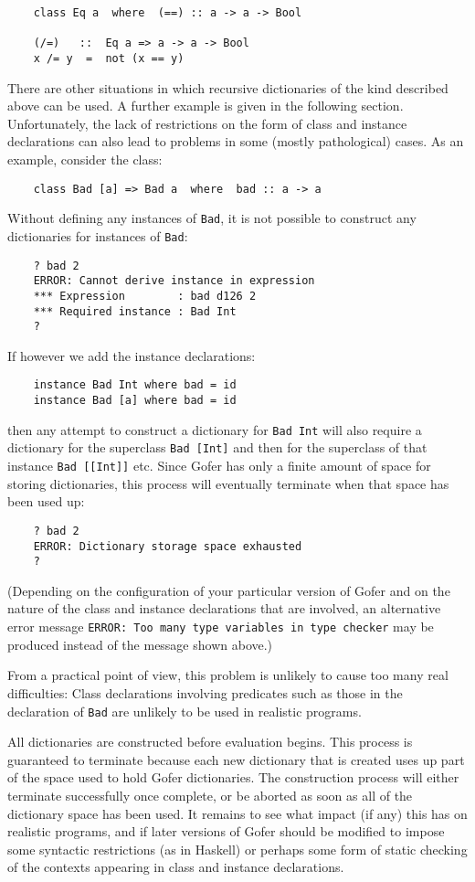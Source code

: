 \begin{verbatim}
    class Eq a  where  (==) :: a -> a -> Bool

    (/=)   ::  Eq a => a -> a -> Bool
    x /= y  =  not (x == y)
\end{verbatim}
There are other situations in which recursive dictionaries of the  kind
described above can be  used.   A  further  example  is  given  in  the
following section.  Unfortunately, the lack of restrictions on the form
of class and instance declarations can also lead to  problems  in  some
(mostly pathological) cases.  As an example, consider the class:
\begin{verbatim}
    class Bad [a] => Bad a  where  bad :: a -> a
\end{verbatim}
Without defining any instances of \verb"Bad", it is not possible to  construct
any dictionaries for instances of \verb"Bad":
\begin{verbatim}
    ? bad 2
    ERROR: Cannot derive instance in expression
    *** Expression        : bad d126 2
    *** Required instance : Bad Int
    ?
\end{verbatim}
If however we add the instance declarations:
\begin{verbatim}
    instance Bad Int where bad = id
    instance Bad [a] where bad = id
\end{verbatim}
then any attempt to construct  a  dictionary  for  \verb"Bad Int"  will  also
require a dictionary for the superclass \verb"Bad [Int]"  and  then  for  the
superclass of that instance \verb"Bad [[Int]]" etc.  Since Gofer has only  a
finite amount of space for  storing  dictionaries,  this  process  will
eventually terminate when that space has been used up:
\begin{verbatim}
    ? bad 2
    ERROR: Dictionary storage space exhausted
    ?
\end{verbatim}
(Depending on the configuration of your  particular  version  of
Gofer and on the nature of the class and instance declarations that are
involved, an alternative error message {\tt ERROR: Too many type  variables
in type checker} may be produced instead of the message shown above.)

From a practical point of view, this problem is unlikely to  cause  too
many real difficulties:
\BI
\IT  Class declarations involving  predicates  such  as  those  in  the
     declaration of \verb"Bad" are unlikely to be used in realistic programs.

\IT  All dictionaries are constructed before evaluation  begins.   This
     process is guaranteed to terminate  because  each  new  dictionary
     that is created uses up part of  the  space  used  to  hold  Gofer
     dictionaries.  The  construction  process  will  either  terminate
     successfully once complete, or be aborted as soon as  all  of  the
     dictionary space has been used.
\EI
It remains to see what impact (if any) this has on realistic  programs,
and if later versions of  Gofer  should  be  modified  to  impose  some
syntactic restrictions (as in Haskell) or perhaps some form  of  static
checking of the contexts appearing in class and instance  declarations.


